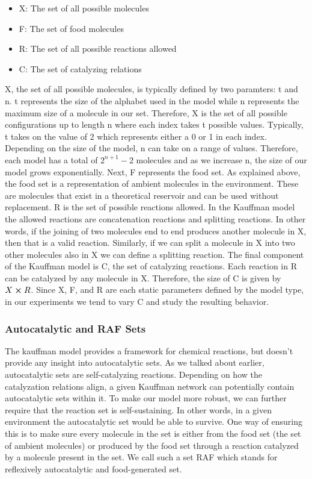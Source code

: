 \documentclass[11pt]{article}
\begin{document}
\begin{itemize}
    \item X: The set of all possible molecules
    \item F: The set of food molecules
    \item R: The set of all possible reactions allowed
    \item C: The set of catalyzing relations
\end{itemize}

X, the set of all possible molecules, is typically defined by two paramters: t and n. t represents the size of the alphabet used in the model while n represents the maximum size of a molecule in our set. 
Therefore, X is the set of all possible configurations up to length n where each index takes t possible values.
Typically, t takes on the value of 2 which represents either a 0 or 1 in each index. Depending on the size of the model, n can take on a range of values. Therefore, each model has a total of $2^{n +1} -2$ molecules and as we increase n, the size of our model grows exponentially.
Next, F represents the food set. As explained above, the food set is a representation of ambient molecules in the environment. These are molecules that exist in a theoretical reservoir and can be used without replacement.
R is the set of possible reactions allowed. In the Kauffman model the allowed reactions are concatenation reactions and splitting reactions. In other words, if the joining of two molecules end to end produces another molecule in X, then that is a valid reaction.
Similarly, if we can split a molecule in X into two other molecules also in X we can define a splitting reaction.
The final component of the Kauffman model is C, the set of catalyzing reactions. Each reaction in R can be catalyzed by any molecule in X. Therefore, the size of C is given by $X \cross R$. 
Since X, F, and R are each static parameters defined by the model type, in our experiments we tend to vary C and study the resulting behavior.

\subsubsection{Autocatalytic and RAF Sets}

The kauffman model provides a framework for chemical reactions, but doesn’t provide any insight into autocatalytic sets. 
As we talked about earlier, autocatalytic sets are self-catalyzing reactions. 
Depending on how the catalyzation relations align, a given Kauffman network can potentially contain autocatalytic sets within it. 
To make our model more robust, we can further require that the reaction set is self-sustaining. In other words, in a given environment the autocatalytic set would be able to survive. 
One way of ensuring this is to make sure every molecule in the set is either from the food set (the set of ambient molecules) or produced by the food set through a reaction catalyzed by a molecule present in the set.
We call such a set RAF which stands for reflexively autocatalytic and food-generated set. 
\end{document}
